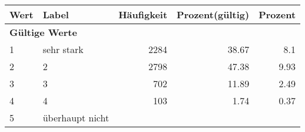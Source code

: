      \begin{longtable}{lXrrr}
     \toprule
     \textbf{Wert} & \textbf{Label} & \textbf{Häufigkeit} & \textbf{Prozent(gültig)} & \textbf{Prozent} \\
     \endhead
     \midrule
     \multicolumn{5}{l}{\textbf{Gültige Werte}}\\

     1 &
     \multicolumn{1}{X}{ sehr stark   } &


       \num{2284} &
       \num[round-mode=places,round-precision=2]{38.67} &
         \num[round-mode=places,round-precision=2]{8.1} \\

     2 &
     \multicolumn{1}{X}{ 2   } &


       \num{2798} &
       \num[round-mode=places,round-precision=2]{47.38} &
         \num[round-mode=places,round-precision=2]{9.93} \\

     3 &
     \multicolumn{1}{X}{ 3   } &


       \num{702} &
       \num[round-mode=places,round-precision=2]{11.89} &
         \num[round-mode=places,round-precision=2]{2.49} \\

     4 &
     \multicolumn{1}{X}{ 4   } &


       \num{103} &
       \num[round-mode=places,round-precision=2]{1.74} &
         \num[round-mode=places,round-precision=2]{0.37} \\

     5 &
     \multicolumn{1}{X}{ überhaupt nicht   } &



\end{longtable}
